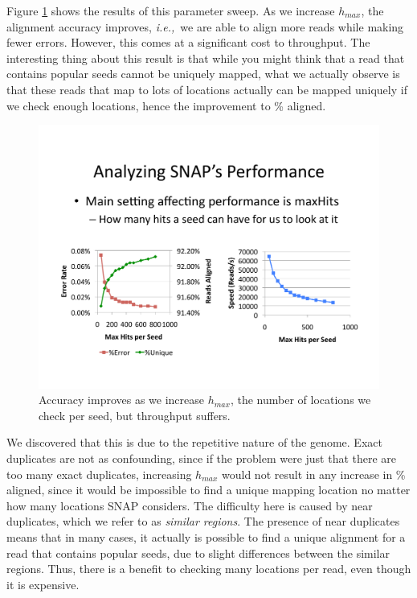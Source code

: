 \documentclass[twocolumn,10pt]{article}
\newcommand{\ie}{{\em i.e.,}~}
\begin{document}
Figure \ref{fig:maxHits} shows the results of this parameter sweep.  As we increase \(h_{max}\), the alignment accuracy improves, \ie we are able to align more reads while making fewer errors.  However, this comes at a significant cost to throughput.  The interesting thing about this result is that while you might think that a read that contains popular seeds cannot be uniquely mapped, what we actually observe is that these reads that map to lots of locations actually can be mapped uniquely if we check enough locations, hence the improvement to \% aligned.

\begin{figure}
\centering
\includegraphics[scale=0.6]{maxHits.pdf}
\caption{Accuracy improves as we increase \(h_{max}\), the number of locations we check per seed, but throughput suffers.}
\label{fig:maxHits}
\end{figure}

We discovered that this is due to the repetitive nature of the genome.  Exact duplicates are not as confounding, since if the problem were just that there are too many exact duplicates, increasing \(h_{max}\) would not result in any increase in \% aligned, since it would be impossible to find a unique mapping location no matter how many locations SNAP considers.  The difficulty here is caused by near duplicates, which we refer to as \textit{similar regions}.  The presence of near duplicates means that in many cases, it actually is possible to find a unique alignment for a read that contains popular seeds, due to slight differences between the similar regions.  Thus, there is a benefit to checking many locations per read, even though it is expensive.
\end{document}
